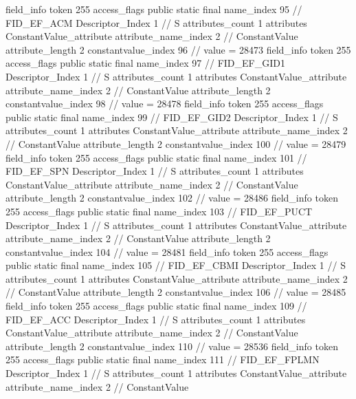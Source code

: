 {{{{{{{				}
				}
			}
			field_info {
				token	255
				access_flags	public static final
				name_index	95		// FID_EF_ACM
				Descriptor_Index	1		// S
				attributes_count	1
				attributes {
				ConstantValue_attribute {
					attribute_name_index	2		// ConstantValue
					attribute_length	2
					constantvalue_index	96		// value = 28473
				}
				}
			}
			field_info {
				token	255
				access_flags	public static final
				name_index	97		// FID_EF_GID1
				Descriptor_Index	1		// S
				attributes_count	1
				attributes {
				ConstantValue_attribute {
					attribute_name_index	2		// ConstantValue
					attribute_length	2
					constantvalue_index	98		// value = 28478
				}
				}
			}
			field_info {
				token	255
				access_flags	public static final
				name_index	99		// FID_EF_GID2
				Descriptor_Index	1		// S
				attributes_count	1
				attributes {
				ConstantValue_attribute {
					attribute_name_index	2		// ConstantValue
					attribute_length	2
					constantvalue_index	100		// value = 28479
				}
				}
			}
			field_info {
				token	255
				access_flags	public static final
				name_index	101		// FID_EF_SPN
				Descriptor_Index	1		// S
				attributes_count	1
				attributes {
				ConstantValue_attribute {
					attribute_name_index	2		// ConstantValue
					attribute_length	2
					constantvalue_index	102		// value = 28486
				}
				}
			}
			field_info {
				token	255
				access_flags	public static final
				name_index	103		// FID_EF_PUCT
				Descriptor_Index	1		// S
				attributes_count	1
				attributes {
				ConstantValue_attribute {
					attribute_name_index	2		// ConstantValue
					attribute_length	2
					constantvalue_index	104		// value = 28481
				}
				}
			}
			field_info {
				token	255
				access_flags	public static final
				name_index	105		// FID_EF_CBMI
				Descriptor_Index	1		// S
				attributes_count	1
				attributes {
				ConstantValue_attribute {
					attribute_name_index	2		// ConstantValue
					attribute_length	2
					constantvalue_index	106		// value = 28485
				}
				}
			}
			field_info {
				token	255
				access_flags	public static final
				name_index	109		// FID_EF_ACC
				Descriptor_Index	1		// S
				attributes_count	1
				attributes {
				ConstantValue_attribute {
					attribute_name_index	2		// ConstantValue
					attribute_length	2
					constantvalue_index	110		// value = 28536
				}
				}
			}
			field_info {
				token	255
				access_flags	public static final
				name_index	111		// FID_EF_FPLMN
				Descriptor_Index	1		// S
				attributes_count	1
				attributes {
				ConstantValue_attribute {
					attribute_name_index	2		// ConstantValue
}}}}}}}
